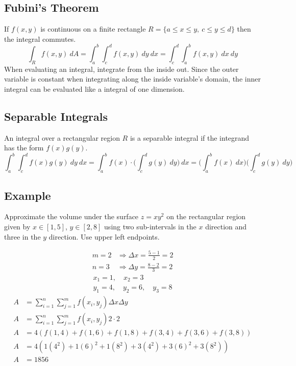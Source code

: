 \documentclass{article}
\theoremstyle{mytheoremstyle}
\theoremstyle{mytheoremstyle}
\theoremstyle{myproblemstyle}
\begin{document}
    \subsection*{Fubini's Theorem}
    If $f(x,y)$ is continuous on a finite rectangle $R=\{a\le x\le y,\ c\le y\le d\}$
    then the integral commutes.
    \[
        \int_R f(x,y)\ dA = \int_a^b \int_c^d f(x,y)\ dy\ dx = \int_c^d \int_a^b f(x,y)\ dx\ dy
    \]
    When evaluating an integral, integrate from the inside out. Since the outer
    variable is constant when integrating along the inside variable's domain,
    the inner integral can be evaluated like a integral of one dimension.

    \subsection*{Separable Integrals}
    An integral over a rectangular region $R$ is a separable integral if the
    integrand has the  form $f(x)g(y)$.
    \[
        \int_{a}^{b} \int_{c}^{d} f(x)g(y) \ dy \ dx
        = \int_{a}^{b} f(x)\cdot \Big(\int_{c}^{d} g(y) \ dy\Big) \ dx
        = \Big(\int_{a}^{b} f(x) \ dx\Big)\Big(\int_{c}^{d} g(y) \ dy\Big)
    \]

    \subsection*{Example}
    Approximate the volume under the surface $z=xy^2$ on the rectangular region
    given by $x\in [1,5]$, $y\in[2,8]$ using two sub-intervals in the $x$
    direction and three in the $y$ direction. Use upper left endpoints.

    \begin{align*}
        m = 2 &\Rightarrow \Delta x = \frac{5-1}{2} = 2 \\
        n = 3 &\Rightarrow \Delta y = \frac{8-2}{3} = 2
    \end{align*}
    \begin{gather*}
        x_1 = 1,\quad x_2 = 3 \\
        y_1 = 4,\quad y_2 = 6,\quad y_3 = 8
    \end{gather*}
    \begin{align*}
        A &= \sum_{i=1}^{n} \sum_{j=1}^{m} f(x_i,y_j) \Delta x \Delta y \\
        A &= \sum_{i=1}^{n} \sum_{j=1}^{m} f(x_i,y_j) 2\cdot 2 \\
        A &= 4 (
            f(1,4) + f(1,6) + f(1,8)
            +f(3,4) + f(3,6) + f(3,8)
        ) \\
        A &= 4 (
            1(4^2) + 1(6)^2 + 1(8^2)
            + 3(4^2) + 3(6)^2 + 3(8^2)
        ) \\
        A &= 1856
    \end{align*}
\end{document}
